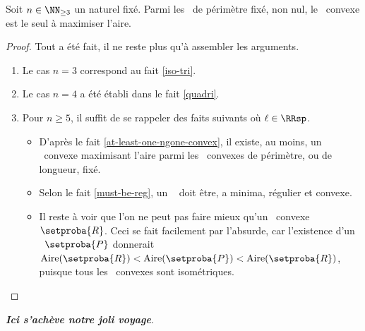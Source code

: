\begin{fact}
    Soit $n \in \NN_{\geq3}$ un naturel fixé.
    Parmi les \ngones\ de périmètre fixé, non nul,
    le \nreg\ convexe est le seul à maximiser l'aire.
\end{fact}


\begin{proof}
    Tout a été fait, il ne reste plus qu'à assembler les arguments.
    \begin{enumerate}
        \item Le cas $n = 3$ correspond au fait \ref{iso-tri}.
        
        \item Le cas $n = 4$ a été établi dans le fait \ref{quadri}.
        
        \item Pour $n \geq 5$, il suffit de se rappeler des faits suivants où $\ell \in \RRsp$.
        \begin{itemize}
            \item D'après le fait \ref{at-least-one-ngone-convex}, il existe, au moins, un \ngone\ convexe maximisant l'aire parmi les \ngones\ convexes de périmètre, ou de longueur, fixé.

            \item Selon le fait \ref{must-be-reg}, un \ngone\  doit être, a minima, régulier et convexe.

            \item Il reste à voir que l'on ne peut pas faire mieux qu'un \nreg\ convexe $\setproba{R}$. Ceci se fait facilement par l'absurde, car l'existence d'un  \ngone\ $\setproba{P}$ donnerait $\area{\setproba{R}} < \area{\setproba{P}} < \area{\setproba{R}}$, puisque tous les \nregs\ convexes sont isométriques. 
        \end{itemize} 
	
	\null\vspace{-6ex}
    \end{enumerate}
\end{proof}

\bigskip
\hfill {\small\itshape\bfseries Ici s'achève notre joli voyage}.